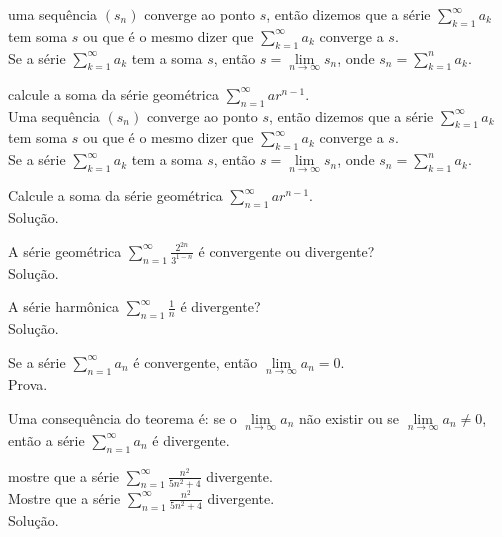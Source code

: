 \begin{df}
	uma sequência $\left( s_{n}\right)$ converge ao ponto $s$, então dizemos que a série $\sum_{k=1}^{\infty} a_{k}$ tem soma $s$ ou que é o mesmo dizer que $\sum_{k=1}^{\infty} a_{k}$ converge a $s$.\\
	Se a série $\sum_{k=1}^{\infty} a_{k}$ tem a soma $s$, então $s=\lim\limits_{n\longrightarrow \infty} s_{n}$, onde $s_{n}=\sum_{k=1}^{n} a_{k}$.
\end{df}
\begin{ex}
	calcule a soma da série geométrica $\sum_{n=1}^{\infty}ar^{n-1}$.\\
	Uma sequência $\left( s_{n}\right)$ converge ao ponto $s$, então dizemos que a série $\sum_{k=1}^{\infty} a_{k}$ tem soma $s$ ou que é o mesmo dizer que $\sum_{k=1}^{\infty} a_{k}$ converge a $s$.\\
	Se a série $\sum_{k=1}^{\infty} a_{k}$ tem a soma $s$, então $s=\lim\limits_{n\longrightarrow \infty} s_{n}$, onde $s_{n}=\sum_{k=1}^{n} a_{k}$.
\end{ex}
\begin{ex}
	Calcule a soma da série geométrica $\sum_{n=1}^{\infty}ar^{n-1}$.\\
	Solução.
\end{ex}
\vspace*{15cm}

\begin{ex}
	A série geométrica $\sum_{n=1}^{\infty}\frac{2^{2n}}{3^{1-n}}$ é convergente ou divergente?\\
	Solução.
\end{ex}
\vspace*{5cm}

\begin{ex}
	A série harmônica $\sum_{n=1}^{\infty}\frac{1}{n}$ é divergente?\\
	Solução.
\end{ex}
\vspace*{5cm}

\begin{teo}
	Se a série $\sum_{n=1}^{\infty} a_{n}$ é convergente, então $\lim\limits_{n\longrightarrow \infty} a_{n}=0$.\\
	Prova.
\end{teo}
\vspace*{5cm}

Uma consequência do teorema é: se o $\lim\limits_{n\longrightarrow \infty} a_{n}$ não existir ou se $\lim\limits_{n\longrightarrow \infty} a_{n}\neq 0$, então a série  $\sum_{n=1}^{\infty} a_{n}$ é divergente.
\begin{ex}
	mostre que a série $\sum_{n=1}^{\infty}\frac{n^{2}}{5n^{2}+4}$ divergente.\\
	Mostre que a série $\sum_{n=1}^{\infty}\frac{n^{2}}{5n^{2}+4}$ divergente.\\
	Solução.
\end{ex}
\vspace*{5cm}

